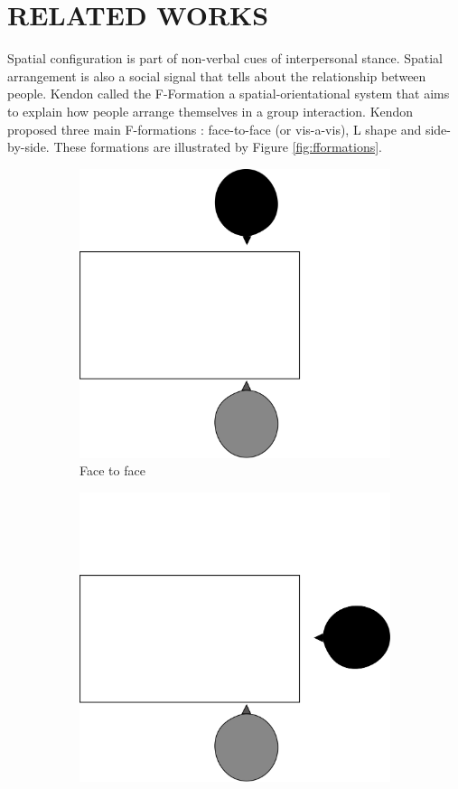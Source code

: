 \documentclass[letterpaper, 10 pt, conference]{ieeeconf}  %
\begin{document}
\section{RELATED WORKS}
Spatial configuration is part of non-verbal cues of interpersonal stance.
Spatial arrangement is also a social signal that tells about the relationship between people.
Kendon \cite{Kendon2010} called the F-Formation a spatial-orientational system that aims to explain how people arrange themselves in a group interaction.
Kendon proposed three main F-formations : face-to-face (or vis-a-vis), L shape and side-by-side. These formations are illustrated by Figure \ref{fig:fformations}.
\begin{figure}[h!]
	\centering
	\begin{subfigure}{0.2\textwidth}
		\centering
		\includegraphics[width=0.75\linewidth]{./figures/fformationff.png}
		\caption{Face to face}
		\label{fig:ff}
	\end{subfigure}%
	\begin{subfigure}{0.2\textwidth}
		\centering
		\includegraphics[width=0.75\linewidth]{./figures/fformationL.png}

\end{subfigure}
\end{figure}
\end{document}
